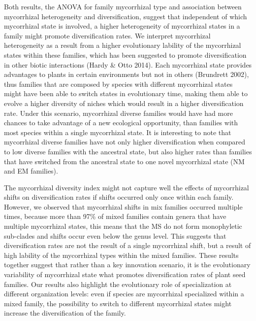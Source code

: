 \documentclass[12pt,]{article}
\begin{document}
Both results, the ANOVA for family mycorrhizal type and association
between mycorrhizal heterogeneity and diversification, suggest that
independent of which mycorrhizal state is involved, a higher
heterogeneity of mycorrhizal states in a family might promote
diversification rates. We interpret mycorrhizal heterogeneity as a
result from a higher evolutionary lability of the mycorrhizal states
within these families, which has been suggested to promote
diversification in other biotic interactions (Hardy \& Otto 2014). Each
mycorrhizal state provides advantages to plants in certain environments
but not in others (Brundrett 2002), thus families that are composed by
species with different mycorrhizal states might have been able to switch
states in evolutionary time, making them able to evolve a higher
diversity of niches which would result in a higher diversification rate.
Under this scenario, mycorrhizal diverse families would have had more
chances to take advantage of a new ecological opportunity, than families
with most species within a single mycorrhizal state. It is interesting
to note that mycorrhizal diverse families have not only higher
diversification when compared to low diverse families with the ancestral
state, but also higher rates than families that have switched from the
ancestral state to one novel mycorrhizal state (NM and EM families).

The mycorrhizal diversity index might not capture well the effects of
mycorrhizal shifts on diversification rates if shifts occurred only once
within each family. However, we observed that mycorrhizal shifts in mix
families occurred multiple times, because more than 97\% of mixed
families contain genera that have multiple mycorrhizal states, this
means that the MS do not form monophyletic sub-clades and shifts occur
even below the genus level. This suggests that diversification rates are
not the result of a single mycorrhizal shift, but a result of high
lability of the mycorrhizal types within the mixed families. These
results together suggest that rather than a key innovation scenario, it
is the evolutionary variability of mycorrhizal state what promotes
diversification rates of plant seed families. Our results also highlight
the evolutionary role of specialization at different organization
levels: even if species are mycorrhizal specialized within a mixed
family, the possibility to switch to different mycorrhizal states might
increase the diversification of the family.
\end{document}
